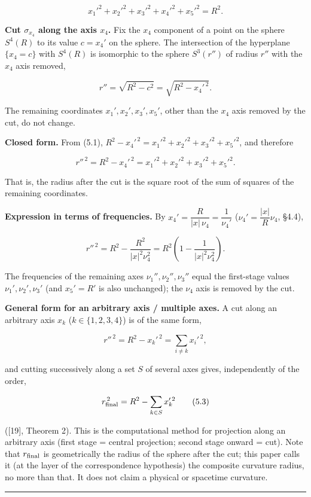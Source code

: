 \documentclass[
]{article}
\begin{document}
\[x_1'^2+x_2'^2+x_3'^2+x_4'^2+x_5'^2=R^2. \tag{5.1}\]

\textbf{Cut \(\sigma_{x_4}\) along the axis \(x_4\).} Fix the \(x_4\)
component of a point on the sphere \(S^4(R)\) to its value \(c=x_4'\) on
the sphere. The intersection of the hyperplane \(\{x_4=c\}\) with
\(S^4(R)\) is isomorphic to the sphere \(S^3(r'')\) of radius \(r''\)
with the \(x_4\) axis removed,

\[r''=\sqrt{R^2-c^2}=\sqrt{R^2-x_4'^{\,2}}.\]

The remaining coordinates \(x_1',x_2',x_3',x_5'\), other than the
\(x_4\) axis removed by the cut, do not change.

\textbf{Closed form.} From (5.1),
\(R^2-x_4'^{\,2}=x_1'^2+x_2'^2+x_3'^2+x_5'^2\), and therefore

\[r''^{\,2}=R^2-x_4'^{\,2}=x_1'^2+x_2'^2+x_3'^2+x_5'^2. \tag{5.2}\]

That is, the radius after the cut is the square root of the sum of
squares of the remaining coordinates.

\textbf{Expression in terms of frequencies.} By
\(x_4'=\dfrac{R}{|x|\,\nu_4}=\dfrac{1}{\nu_4'}\)
(\(\nu_4'=\dfrac{|x|}{R}\nu_4\), §4.4),

\[r''^{\,2}=R^2-\frac{R^2}{|x|^2\nu_4^2}=R^2\left(1-\frac{1}{|x|^2\nu_4^2}\right).\]

The frequencies of the remaining axes \(\nu_1'',\nu_2'',\nu_3''\) equal
the first-stage values \(\nu_1',\nu_2',\nu_3'\) (and \(x_5'=R'\) is also
unchanged); the \(\nu_4\) axis is removed by the cut.

\textbf{General form for an arbitrary axis / multiple axes.} A cut along
an arbitrary axis \(x_k\) (\(k\in\{1,2,3,4\}\)) is of the same form,

\[r''^{\,2}=R^2-x_k'^{\,2}=\sum_{i\neq k}x_i'^{\,2},\]

and cutting successively along a set \(S\) of several axes gives,
independently of the order,

\[r_{\rm final}^{\,2}=R^2-\sum_{k\in S}x_k'^{\,2} \tag{5.3}\]

({[}19{]}, Theorem 2). This is the computational method for projection
along an arbitrary axis (first stage = central projection; second stage
onward = cut). Note that \(r_{\rm final}\) is geometrically the radius
of the sphere after the cut; this paper calls it (at the layer of the
correspondence hypothesis) the composite curvature radius, no more than
that. It does not claim a physical or spacetime curvature.

\begin{center}\rule{0.5\linewidth}{0.5pt}\end{center}
\end{document}
